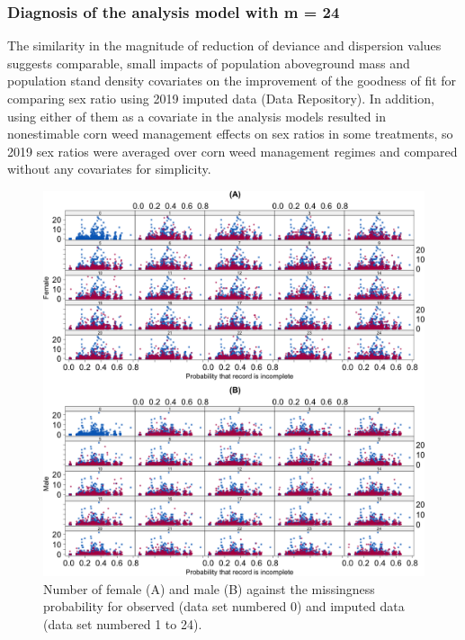 \documentclass[
]{article}
\begin{document}
\hypertarget{diagnosis-of-the-analysis-model-with-m-24}{%
\subsubsection*{Diagnosis of the analysis model with m = 24}\label{diagnosis-of-the-analysis-model-with-m-24}}

The similarity in the magnitude of reduction of deviance and dispersion values suggests comparable, small impacts of population aboveground mass and population stand density covariates on the improvement of the goodness of fit for comparing sex ratio using 2019 imputed data (Data Repository). In addition, using either of them as a covariate in the analysis models resulted in nonestimable corn weed management effects on sex ratios in some treatments, so 2019 sex ratios were averaged over corn weed management regimes and compared without any covariates for simplicity.

\begin{figure}[H]
\includegraphics[width=1\linewidth]{Manuscript_whole_files/figure-latex/kernel-xy-imp1-all-diag-1} \caption{Number of female (A) and male (B) against the missingness probability for observed (data set numbered 0) and imputed data (data set numbered 1 to 24).}\label{fig:kernel-xy-imp1-all-diag}
\end{figure}
\end{document}
